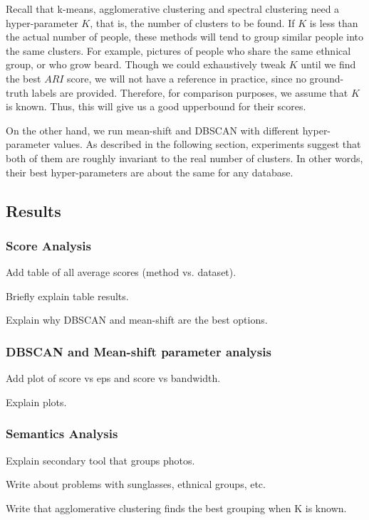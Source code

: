 \documentclass[conference]{IEEEtran}
\begin{document}
Recall that k-means, agglomerative clustering and spectral clustering need a hyper-parameter $K$, that is, the number of clusters to be found.
If $K$ is less than the actual number of people, these methods will tend to group similar people into the same clusters.
For example, pictures of people who share the same ethnical group, or who grow beard.
Though we could exhaustively tweak $K$ until we find the best $ARI$ score, we will not have a reference in practice, since no ground-truth labels are provided.
Therefore, for comparison purposes, we assume that $K$ is known.
Thus, this will give us a good upperbound for their scores.

On the other hand, we run mean-shift and DBSCAN with different hyper-parameter values.
As described in the following section, experiments suggest that both of them are roughly invariant to the real number of clusters.
In other words, their best hyper-parameters are about the same for any database.

\subsection{Results}

\subsubsection{Score Analysis}

Add table of all average scores (method vs. dataset).

Briefly explain table results.

Explain why DBSCAN and mean-shift are the best options.

\subsubsection{DBSCAN and Mean-shift parameter analysis}

Add plot of score vs eps and score vs bandwidth.

Explain plots.

\subsubsection{Semantics Analysis}

Explain secondary tool that groups photos.

Write about problems with sunglasses, ethnical groups, etc.

Write that agglomerative clustering finds the best grouping when K is known.
\end{document}
